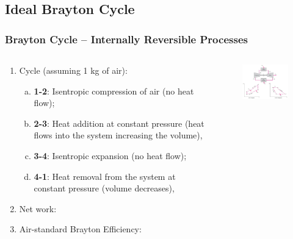 \documentclass[10pt,compress]{beamer}
\begin{document}
\subsection{Ideal Brayton Cycle}

\begin{frame}
 \frametitle{Brayton Cycle -- Internally Reversible Processes}
 \begin{columns}
  \begin{column}[c]{0.5\linewidth} 
   \begin{enumerate}[(1)]\scriptsize
    \item<1-> Cycle (assuming 1 kg of air):
       \begin{enumerate}[(a)]\scriptsize
         \item<1->{\bf 1-2}: Isentropic compression of air (no heat flow);
         \item<2->{\bf 2-3}: Heat addition at constant pressure (heat flows into the system increasing the volume),
         \item<3->{\bf 3-4}: Isentropic expansion (no heat flow);
         \item<4->{\bf 4-1}: Heat removal from the system at constant pressure (volume decreases), 
       \end{enumerate}
    \item<5-> Net work:
    \item<6-> Air-standard Brayton Efficiency:
   \end{enumerate}
  \end{column}
  \begin{column}[c]{0.5\linewidth}
    \begin{center}
   \begin{figure}%
     \includegraphics[height=5.cm,width=5.5cm,clip]{./Pics/Brayton_cycle1}

\end{figure}
\end{center}
\end{column}
\end{columns}
\end{frame}
\end{document}
